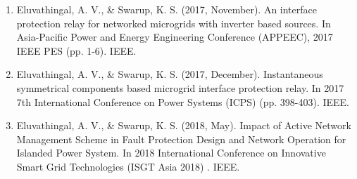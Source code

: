 \begin{enumerate}[{\bfseries I.}, leftmargin=1cm,itemindent=0em,]
\begin{enumerate}
         \item Eluvathingal, A. V., \& Swarup, K. S. (2017, November). An interface protection relay for  networked microgrids with inverter based sources. In Asia-Pacific Power and Energy Engineering  Conference (APPEEC), 2017 IEEE PES (pp. 1-6). IEEE. 
 
        \item Eluvathingal, A. V., \& Swarup, K. S. (2017, December). Instantaneous symmetrical components  based microgrid interface protection relay. In 2017 7th International Conference on Power Systems (ICPS) (pp. 398-403). IEEE. 
 
        \item Eluvathingal, A. V., \& Swarup, K. S. (2018, May). Impact of Active Network Management  Scheme in Fault Protection Design and Network Operation for Islanded Power System. In 2018   International Conference on Innovative Smart Grid Technologies (ISGT Asia 2018) . IEEE. \par
         
    \end{enumerate}\par
        
     
       
\end{enumerate}
